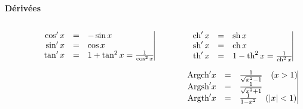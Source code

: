 \begin{frame}
\centerline{\textbf{D\'eriv\'ees}}

\begin{columns}

\begin{column}{2cm}
  
\end{column}

\begin{column}{6cm}

$$\begin{array}{rcl@{\vrule depth 1.2ex height 3ex width 0mm }}
\cos'x&=& -\sin x\\
\sin'x&=&\cos x\\
\tan' x &=& 1+\tan^2x=\frac{1}{\cos^2x}\\
  \end{array}$$


\end{column}

\pause
\pause

\begin{column}{6cm}
$$\begin{array}{rcl@{\vrule depth 1.2ex height 3ex width 0mm }}
\ch'x&=& \sh x\\
\sh'x&=&\ch x\\
\tanh' x &=& 1-\tanh^2x=\frac{1}{\ch^2x}\\
  \end{array}$$

\pause
\pause

$$\begin{array}{rcl@{\vrule depth 1.2ex height 3ex width 0mm }}
\text{Argch}'x&=&\frac{1}{\sqrt{x^2-1}} \quad (x>1)\\
\text{Argsh}'x&=&\frac{1}{\sqrt{x^2+1}} \\
\text{Argth}'x&=&\frac{1}{1-x^2} \quad (|x|<1)\\
  \end{array}$$
\end{column}
\end{columns}


\end{frame}


